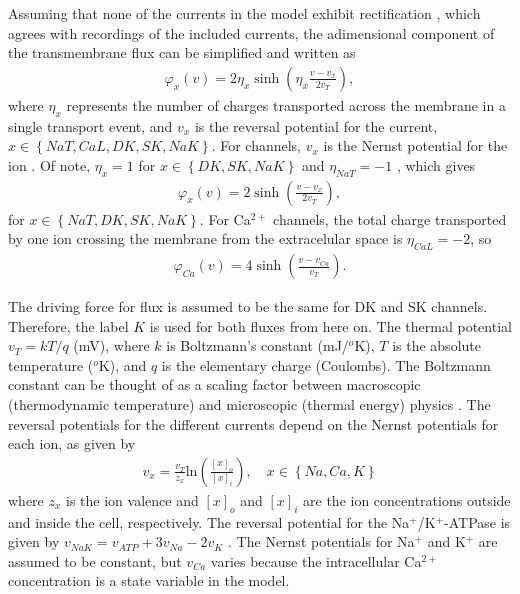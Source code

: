 \documentclass[10pt,letterpaper]{article}
\newcommand{\Ca}{Ca$^{2+}$}
\newcommand{\K}{K$^{+}$}
\newcommand{\Na}{Na$^{+}$}
\newcommand{\lrSet}[1]{\left\{#1\right\}}
\begin{document}
Assuming that none of the currents in the model exhibit rectification  \cite{herrera2018thermodynamic}, which agrees with recordings of the included currents, the adimensional component of the transmembrane flux can  be simplified and written as
\begin{eqnarray}
    \varphi_x(v) = 2\eta_x \sinh\left(\eta_x \frac{v-v_x}{2v_T}\right),
\end{eqnarray} 
where $\eta_x$ represents the number of charges transported across the membrane in a single transport event, and $v_x$ is the reversal potential for the current,   
 $x \in \left\{NaT,CaL,DK,SK,NaK \right\}$. For channels, $v_x$ is the Nernst potential for the ion \cite{herrera2018thermodynamic}. Of note,  $\eta_x=1$ for $x \in \lrSet{DK,SK,NaK}$ and $\eta_{NaT}=-1$   \cite{herrera2018thermodynamic}, which gives 
\begin{eqnarray}
    \varphi_x(v) = 2 \sinh\left( \frac{v-v_{x}}{2v_T}\right),
\end{eqnarray} 
for $x \in \lrSet{NaT,DK,SK,NaK}$.
For {\Ca} channels, the total charge transported by one ion crossing the membrane from the extracelular space is $\eta_{CaL}=-2$, so
\begin{eqnarray}
    \varphi_{Ca}(v) = 4 \sinh\left( \frac{v-v_{Ca}}{v_T}\right).
\end{eqnarray} 

The driving force for flux is assumed to be the same for DK and SK channels. Therefore, the label $K$ is used for both fluxes from here on.   
The thermal potential $v_T=kT/q$ (mV), where $k$ is Boltzmann's constant (mJ/$^o$K), $T$ is the  absolute temperature ($^o$K), and $q$ is the elementary charge  (Coulombs). The Boltzmann constant can be thought of as a scaling factor between macroscopic (thermodynamic temperature) and microscopic (thermal energy) physics \cite{kalinin2005boltzmann}. The reversal potentials for the different currents depend on the  Nernst potentials for each ion, as given by 
\begin{eqnarray}
v_x = \frac{v_T}{z_x} \textrm{ln} \left(\frac{[x]_o}{[x]_i} \right), \quad x \in  \left\{Na,Ca,K \right\}
\end{eqnarray}
where $z_x$ is the ion valence and $[x]_o$ and $[x]_i$ are the ion concentrations outside and inside the cell, respectively. The reversal potential for the {\Na}/{\K}-ATPase is given by ${v_{NaK}=v_{ATP}+3v_{Na}-2v_{K}}$ \cite{herrera2018thermodynamic}. The Nernst potentials for {\Na} and {\K} are assumed to be constant, but $v_{Ca}$ varies because the intracellular {\Ca} concentration is a state variable in the model.  
\end{document}
